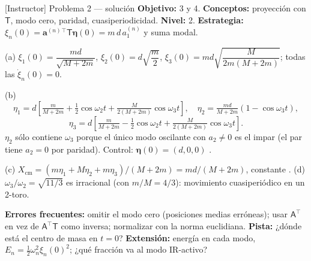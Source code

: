 \documentclass[spanish,10pt]{beamer}
\newcommand{\Tm}{\mathsf{T}}                 %
\newcommand{\Am}{\mathsf{A}}                 %
\newcommand{\ev}{\bm{\eta}}                  %
\newcommand{\av}[1]{\mathbf{a}^{(#1)}}       %
\newcommand{\tr}{^{\top}}                    %
\newcommand{\ok}{\checkmark}
\begin{document}
\begin{frame}{[Instructor] Problema 2 — solución}
\footnotesize
\textbf{Objetivo:} 3 y 4. \textbf{Conceptos:} proyección con $\Tm$, modo cero, paridad, cuasiperiodicidad. \textbf{Nivel:} 2. \textbf{Estrategia:} $\xi_n(0)=\av n{}\tr\Tm\ev(0)=m\,d\,a_1^{(n)}$ y suma modal.

(a) $\xi_1(0)=\dfrac{md}{\sqrt{M+2m}}$, \; $\xi_2(0)=d\sqrt{\dfrac m2}$, \; $\xi_3(0)=md\sqrt{\dfrac{M}{2m(M+2m)}}$; todas las $\dot\xi_n(0)=0$.

(b)
\[
\eta_1=d\left[\tfrac{m}{M+2m}+\tfrac12\cos\omega_2t+\tfrac{M}{2(M+2m)}\cos\omega_3t\right],\quad
\eta_2=\tfrac{md}{M+2m}\left(1-\cos\omega_3t\right),
\]
\[
\eta_3=d\left[\tfrac{m}{M+2m}-\tfrac12\cos\omega_2t+\tfrac{M}{2(M+2m)}\cos\omega_3t\right].
\]
$\eta_2$ sólo contiene $\omega_3$ porque el único modo oscilante con $a_2\neq0$ es el impar (el par tiene $a_2=0$ por paridad). Control: $\ev(0)=(d,0,0)$ \ok.

(c) $X_{\mathrm{cm}}=(m\eta_1+M\eta_2+m\eta_3)/(M+2m)=md/(M+2m)$, constante \ok.
(d) $\omega_3/\omega_2=\sqrt{11/3}$ es irracional (con $m/M=4/3$): movimiento cuasiperiódico en un 2-toro.

\textbf{Errores frecuentes:} omitir el modo cero (posiciones medias erróneas); usar $\Am\tr$ en vez de $\Am\tr\Tm$ como inversa; normalizar con la norma euclidiana. \textbf{Pista:} ¿dónde está el centro de masa en $t=0$? \textbf{Extensión:} energía en cada modo, $E_n=\frac12\omega_n^2\xi_n(0)^2$; ¿qué fracción va al modo IR-activo?
\end{frame}
\end{document}
